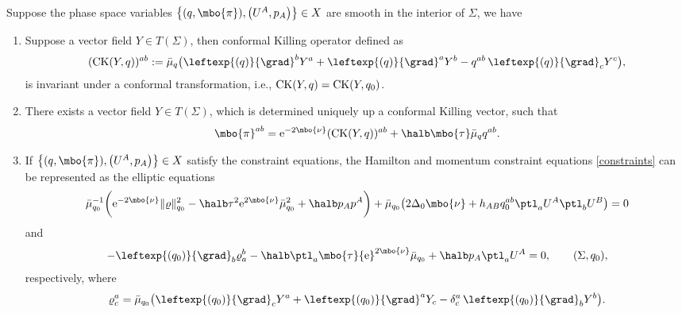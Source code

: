 \begin{Lemma}
Suppose the phase space variables $ \bigl\{ (q, \mbo{\pi}), \bigl(U^A, p_A\bigr) \bigr\} \in X$ are smooth in the interior of $\Sigma$, we have
\begin{enumerate}\itemsep=0pt
\item[$(1)$] Suppose a vector field $Y \in T (\Sigma)$, then conformal Killing operator defined as
\begin{align*}
({\rm CK}(Y, q))^{ab}:= \bar{\mu}_q \bigl(\leftexp{(q)}{\grad}^b Y^a + \leftexp{(q)}{\grad}^a Y^b - q^{ab} \, \leftexp{(q)}{\grad}_c Y^c\bigr),
\end{align*}
is invariant under a conformal transformation, i.e., ${\rm CK} (Y,q) = {\rm CK}(Y, q_0)$.
\item[$(2)$] There exists a vector field $Y \in T(\Sigma)$, which is determined uniquely up a conformal Killing vector, such that
\begin{align*}
\mbo{\pi}^{ab}= {\rm e}^{-2 \mbo{\nu}} ({\rm CK}(Y, q))^{ab} + \halb \mbo{\tau} \bar{\mu}_q q^{ab}.
\end{align*}
\item[$(3)$] If $ \bigl\{ (q, \mbo{\pi}), \bigl(U^A, p_A\bigr) \bigr\} \in X$ satisfy the constraint equations, the Hamilton and momentum constraint equations \eqref{constraints} can be represented as the elliptic equations
\begin{align*}
\bar{\mu}^{-1}_{q_0} \biggl({\rm e}^{-2 \mbo{\nu}} \Vert \varrho \Vert^2_{q_0} - \halb \tau^2 {\rm e}^{2 \mbo{\nu}} \bar{\mu}^2_{q_0} + \halb p_A p^A\biggr)
+ \bar{\mu}_{q_0} \bigl(2 \Delta_0 \mbo{\nu} + h_{AB} q_0^{ab} \ptl_a U^A \ptl_b U^B\bigr) =0
\end{align*}
and
\[
-\leftexp{(q_0)}{\grad}_b \varrho^b_a - \halb \ptl_a \mbo{\tau} {\rm e}^{2 \mbo{\nu}} \bar{\mu}_{q_0} + \halb p_A \ptl_a U^A=0, \qquad (\Sigma, q_0),
\]
respectively, where
\begin{align}\label{varrho-def}
\varrho^a_c= \bar{\mu}_{q_0} \bigl(\leftexp{(q_0)}{\grad}_c Y^a + \leftexp{(q_0)}{\grad}^a Y_c - \delta^a_c \, \leftexp{(q_0)}{\grad}_b Y^b\bigr).
\end{align}
\end{enumerate}
\end{Lemma}
